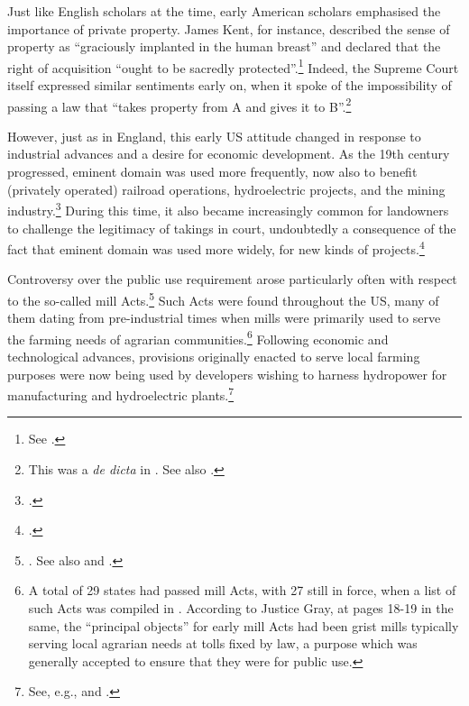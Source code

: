 
Just like English scholars at the time, early American scholars emphasised the importance of private property. James Kent, for instance, described the sense of property as ``graciously implanted in the human breast'' and declared that the right of acquisition ``ought to be sacredly protected''.\footnote{See \cite[see][257]{kent27}.} Indeed, the Supreme Court itself expressed similar sentiments early on, when it spoke of the impossibility of passing a law that ``takes property from A and gives it to B''.\footnote{This was a {\it de dicta} in \cite[388]{calder98}. See also \cite[310]{vanhorne95}.}

However, just as in England, this early US attitude changed in response to industrial advances and a desire for economic development. As the 19th century progressed, eminent domain was used more frequently, now also to benefit (privately operated) railroad operations, hydroelectric projects, and the mining industry.\footcite[23-33]{meidinger80} During this time, it also became increasingly common for landowners to challenge the legitimacy of takings in court, undoubtedly a consequence of the fact that eminent domain was used more widely, for new kinds of projects.\footcite[24]{meidinger80} 

Controversy over the public use requirement arose particularly often with respect to the so-called mill Acts.\footnote{\cite[24]{meidinger80}. See also \cite[306-313]{johnson11} and \cite[251-252]{horwitz73}.} Such Acts were found throughout the US, many of them dating from pre-industrial times when mills were primarily used to serve the farming needs of agrarian communities.\footnote{A total of 29 states had passed mill Acts, with 27 still in force, when a list of such Acts was compiled in \cite[17]{head85}. According to Justice Gray, at pages 18-19 in the same, the ``principal objects'' for early mill Acts had been grist mills typically serving local agrarian needs at tolls fixed by law, a purpose which was generally accepted to ensure that they were for public use.} Following economic and technological advances, provisions originally enacted to serve local farming purposes were now being used by developers wishing to harness hydropower for manufacturing and hydroelectric plants.\footnote{See, e.g., \cite[18-21]{head85} and \cite[449-452]{minn06}.}

